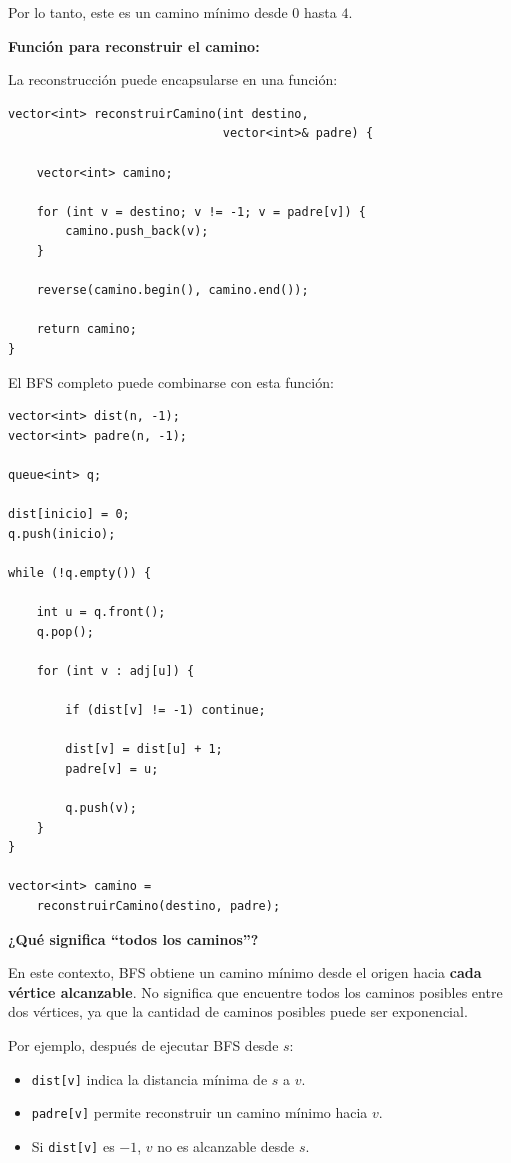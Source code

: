 \documentclass[10pt,a4paper,twocolumn]{article}
\begin{document}
Por lo tanto, este es un camino mínimo desde $0$ hasta $4$.

\textbf{Función para reconstruir el camino:}

La reconstrucción puede encapsularse en una función:

\begin{lstlisting}[style=cpp]
vector<int> reconstruirCamino(int destino,
                              vector<int>& padre) {

    vector<int> camino;

    for (int v = destino; v != -1; v = padre[v]) {
        camino.push_back(v);
    }

    reverse(camino.begin(), camino.end());

    return camino;
}
\end{lstlisting}

El BFS completo puede combinarse con esta función:

\begin{lstlisting}[style=cpp]
vector<int> dist(n, -1);
vector<int> padre(n, -1);

queue<int> q;

dist[inicio] = 0;
q.push(inicio);

while (!q.empty()) {

    int u = q.front();
    q.pop();

    for (int v : adj[u]) {

        if (dist[v] != -1) continue;

        dist[v] = dist[u] + 1;
        padre[v] = u;

        q.push(v);
    }
}

vector<int> camino =
    reconstruirCamino(destino, padre);
\end{lstlisting}

\textbf{¿Qué significa ``todos los caminos''?}

En este contexto, BFS obtiene un camino mínimo desde el origen hacia
\textbf{cada vértice alcanzable}. No significa que encuentre todos los
caminos posibles entre dos vértices, ya que la cantidad de caminos
posibles puede ser exponencial.

Por ejemplo, después de ejecutar BFS desde $s$:

\begin{itemize}
    \item \texttt{dist[v]} indica la distancia mínima de $s$ a $v$.
    \item \texttt{padre[v]} permite reconstruir un camino mínimo hacia
    $v$.
    \item Si \texttt{dist[v]} es $-1$, $v$ no es alcanzable desde $s$.
\end{itemize}
\end{document}
